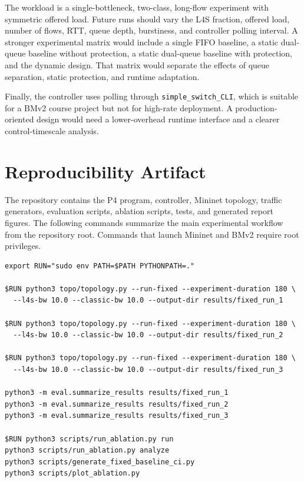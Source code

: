 \documentclass[10pt]{article}
\begin{document}
The workload is a single-bottleneck, two-class, long-flow experiment with symmetric offered load. Future runs should vary the L4S fraction, offered load, number of flows, RTT, queue depth, burstiness, and controller polling interval. A stronger experimental matrix would include a single FIFO baseline, a static dual-queue baseline without protection, a static dual-queue baseline with protection, and the dynamic design. That matrix would separate the effects of queue separation, static protection, and runtime adaptation.

Finally, the controller uses polling through \texttt{simple\_switch\_CLI}, which is suitable for a BMv2 course project but not for high-rate deployment. A production-oriented design would need a lower-overhead runtime interface and a clearer control-timescale analysis.

\section{Reproducibility Artifact}

The repository contains the P4 program, controller, Mininet topology, traffic generators, evaluation scripts, ablation scripts, tests, and generated report figures. The following commands summarize the main experimental workflow from the repository root. Commands that launch Mininet and BMv2 require root privileges.

\begin{verbatim}
export RUN="sudo env PATH=$PATH PYTHONPATH=."

$RUN python3 topo/topology.py --run-fixed --experiment-duration 180 \
  --l4s-bw 10.0 --classic-bw 10.0 --output-dir results/fixed_run_1

$RUN python3 topo/topology.py --run-fixed --experiment-duration 180 \
  --l4s-bw 10.0 --classic-bw 10.0 --output-dir results/fixed_run_2

$RUN python3 topo/topology.py --run-fixed --experiment-duration 180 \
  --l4s-bw 10.0 --classic-bw 10.0 --output-dir results/fixed_run_3

python3 -m eval.summarize_results results/fixed_run_1
python3 -m eval.summarize_results results/fixed_run_2
python3 -m eval.summarize_results results/fixed_run_3

$RUN python3 scripts/run_ablation.py run
python3 scripts/run_ablation.py analyze
python3 scripts/generate_fixed_baseline_ci.py
python3 scripts/plot_ablation.py
\end{verbatim}
\end{document}
